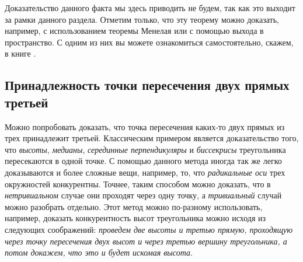 \documentclass[14pt]{extarticle}
\theoremstyle{definition}
\theoremstyle{theorem}
\begin{document}
Доказательство данного факта мы здесь приводить не будем, так как это выходит
за рамки данного раздела. Отметим только, что эту теорему можно доказать, 
например, с использованием теоремы Менелая или с помощью выхода в
пространство. С одним из них  вы можете ознакомиться самостоятельно, скажем,
в книге .

\subsection{Принадлежность точки пересечения двух прямых третьей}

\begin{figure}

\vspace{0cm}
\vspace{-1cm}
\end{figure}

Можно попробовать доказать, что точка пересечения каких-то двух прямых из трех
принадлежит третьей. Классическим примером является доказательство
того, что \textit{высоты}, \textit{медианы}, \textit{серединные перпендикуляры} и
\textit{биссекрисы} треугольника пересекаются в одной точке.
С помощью данного метода иногда так же легко доказываются и более сложные вещи,
например, то, что \textit{радикальные оси} трех окружностей конкурентны. 
Точнее, таким способом можно доказать, что в \textit{нетривиальном} случае они 
проходят через одну точку, а \textit{тривиальный} случай можно разобрать
отдельно. Этот метод можно по-разному использовать, например, доказать
конкурентность высот треугольника можно исходя из следующих соображений: 
\textit{проведем две высоты и третью прямую, проходящую через точку пересечения
двух высот и через третью вершину треугольника, а потом докажем, что это и будет
искомая высота}.
\end{document}

